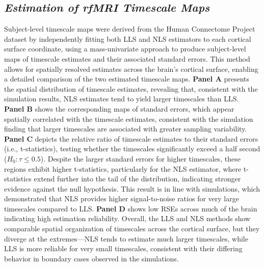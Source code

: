 \documentclass[latex/main.tex]{subfiles}
\begin{document}
\subsection{\textit{Estimation of rfMRI Timescale Maps}}
Subject-level timescale maps were derived from the Human Connectome Project dataset by independently fitting both LLS and NLS estimators to each cortical surface coordinate, using a mass-univariate approach to produce subject-level maps of timescale estimates and their associated standard errors. This method allows for spatially resolved estimates across the brain's cortical surface, enabling a detailed comparison of the two estimated timescale maps. \textbf{Panel A} presents the spatial distribution of timescale estimates, revealing that, consistent with the simulation results, NLS estimates tend to yield larger timescales than LLS. \textbf{Panel B} shows the corresponding maps of standard errors, which appear spatially correlated with the timescale estimates, consistent with the simulation finding that larger timescales are associated with greater sampling variability. \textbf{Panel C} depicts the relative ratio of timescale estimates to their standard errors (i.e., t-statistics), testing whether the timescales significantly exceed a half second ($H_0: \tau \leq 0.5$). Despite the larger standard errors for higher timescales, these regions exhibit higher t-statistics, particularly for the NLS estimator, where t-statistics extend further into the tail of the distribution, indicating stronger evidence against the null hypothesis. This result is in line with simulations, which demonstrated that NLS provides higher signal-to-noise ratios for very large timescales compared to LLS. \textbf{Panel D} shows low RSEs across much of the brain indicating high estimation reliability. Overall, the LLS and NLS methods show comparable spatial organization of timescales across the cortical surface, but they diverge at the extremes—NLS tends to estimate much larger timescales, while LLS is more reliable for very small timescales, consistent with their differing behavior in boundary cases observed in the simulations.\\
\end{document}
